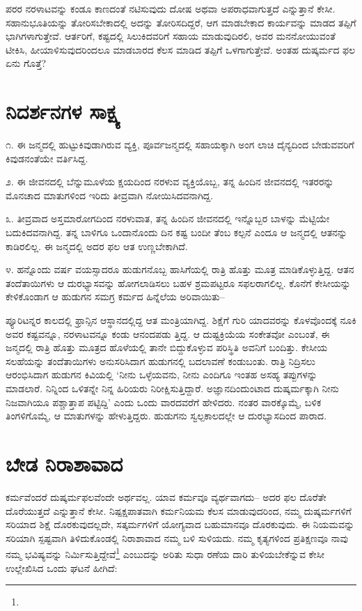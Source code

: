 ಪರರ ನರಳಾಟವನ್ನು ಕಂಡೂ ಕಾಣದಂತೆ ನಟಿಸುವುದು ದೋಷ ಅಥವಾ ಅಪರಾಧವಾಗುತ್ತದೆ ಎನ್ನುತ್ತಾನೆ ಕೇಸೀ. ಸಹಾನುಭೂತಿಯನ್ನು ತೋರಿಸಬೇಕಾದಲ್ಲಿ ಅದನ್ನು ತೋರಿಸದಿದ್ದರೆ, ಆಗ ಮಾಡಬೇಕಾದ ಕಾರ್ಯವನ್ನು ಮಾಡದ ತಪ್ಪಿಗೆ  ಭಾಗಿಗಳಾಗುತ್ತೇವೆ. ಆರ್ತರಿಗೆ, ಕಷ್ಟದಲ್ಲಿ ಸಿಲುಕಿದವರಿಗೆ ಸಹಾಯ ಮಾಡುವುದಿರಲಿ, ಅವರ ಮನನೋಯುವಂತೆ ಟೀಕಿಸಿ, ಹೀಯಾಳಿಸುವುದರಿಂದಲೂ ಮಾಡಬಾರದ ಕೆಲಸ ಮಾಡಿದ ತಪ್ಪಿಗೆ  ಒಳಗಾಗುತ್ತೇವೆ. ಅಂತಹ ದುಷ್ಕರ್ಮದ ಫಲ ಏನು ಗೊತ್ತೆ?


\section{ನಿದರ್ಶನಗಳ ಸಾಕ್ಷ್ಯ}

೧. ಈ ಜನ್ಮದಲ್ಲಿ ಹುಟ್ಟುಕಿವುಡಾಗಿರುವ ವ್ಯಕ್ತಿ, ಪೂರ್ವಜನ್ಮದಲ್ಲಿ ಸಹಾಯಕ್ಕಾಗಿ ಅಂಗ ಲಾಚಿ ದೈನ್ಯದಿಂದ ಬೇಡುವವರಿಗೆ ಕಿವುಡನಂತೆಯೇ ವರ್ತಿಸಿದ್ದ.

೨. ಈ ಜೀವನದಲ್ಲಿ ಬೆನ್ನುಮೂಳೆಯ ಕ್ಷಯದಿಂದ ನರಳುವ ವ್ಯಕ್ತಿಯೊಬ್ಬ, ತನ್ನ ಹಿಂದಿನ ಜೀವನದಲ್ಲಿ ಇತರರನ್ನು ಮೊನಚಾದ ಮಾತುಗಳಿಂದ ಇರಿದು ತೀವ್ರವಾಗಿ ನೋಯಿಸಿದವನಾಗಿದ್ದ.

೩. ತೀವ್ರವಾದ ಅಸ್ತಮಾರೋಗದಿಂದ ನರಳುವಾತ, ತನ್ನ ಹಿಂದಿನ ಜೀವನದಲ್ಲಿ ಇನ್ನೊಬ್ಬರ ಬಾಳನ್ನು ಮೆಟ್ಟಿಯೇ ಬದುಕಿದವನಾಗಿದ್ದ. ತನ್ನ ಬಾಳಿಗೂ ಒಂದಾನೊಂದು ದಿನ ಕಷ್ಟ ಬಂದೀ ತೆಂಬ ಕಲ್ಪನೆ ಎಂದೂ ಆ ಜನ್ಮದಲ್ಲಿ ಆತನನ್ನು ಕಾಡಿರಲಿಲ್ಲ. ಈ ಜನ್ಮದಲ್ಲಿ ಅದರ ಫಲ ಆತ ಉಣ್ಣಬೇಕಾಗಿದೆ.

೪. ಹನ್ನೊಂದು ವರ್ಷ ವಯಸ್ಸಾದರೂ ಹುಡುಗನೊಬ್ಬ ಹಾಸಿಗೆಯಲ್ಲಿ ರಾತ್ರಿ ಹೊತ್ತು ಮೂತ್ರ ಮಾಡಿಕೊಳ್ಳುತ್ತಿದ್ದ. ಆತನ ತಂದೆತಾಯಿಗಳು ಆ ದುರಭ್ಯಾಸವನ್ನು ಹೋಗಲಾಡಿಸಲು ಬಹಳ ಶ್ರಮಪಟ್ಟರೂ ಸಫಲರಾಗಲಿಲ್ಲ. ಕೊನೆಗೆ ಕೇಸೀಯನ್ನು ಕೇಳಿಕೊಂಡಾಗ ಆ ಹುಡುಗನ ಸಮಗ್ರ ಕರ್ಮದ ಹಿನ್ನೆಲೆಯ ಅರಿವಾಯಿತು–

ಪ್ಯೂರಿಟನ್ನರ ಕಾಲದಲ್ಲಿ ಫ್ರಾನ್ಸಿನ ಆಸ್ಥಾನದಲ್ಲಿದ್ದ ಆತ ಮಂತ್ರಿಯಾಗಿದ್ದ. ಶಿಕ್ಷೆಗೆ ಗುರಿ ಯಾದವರನ್ನು ಕೊಳವೊಂದಕ್ಕೆ ನೂಕಿ ಅವರ ಕಷ್ಟವನ್ನೂ, ನರಳಾಟವನ್ನೂ ಕಂಡು ಆನಂದಪಡು ತ್ತಿದ್ದ. ಆ ದುಷ್ಟಕ್ರಿಯೆಯ ಸಂಕೇತವೋ ಎಂಬಂತೆ, ಈ ಜನ್ಮದಲ್ಲಿ ರಾತ್ರಿ ಹೊತ್ತು ಮೂತ್ರದ ಹೊಳೆಯಲ್ಲಿ ತಾನೇ ಬಿದ್ದುಕೊಳ್ಳುವ ಪರಿಸ್ಥಿತಿ ಅವನಿಗೆ ಬಂದಿತ್ತು. ಕೇಸೀಯ ಸಲಹೆಯನ್ನು ತಂದೆತಾಯಿಗಳು ಅನುಸರಿಸಿದಾಗ ಹುಡುಗನಲ್ಲಿ ಬದಲಾವಣೆ ಕಂಡುಬಂತು. ರಾತ್ರಿ ನಿದ್ರಿಸಲು ಆರಂಭಿಸಿದಾಗ ಹುಡುಗನ ಕಿವಿಯಲ್ಲಿ ‘ನೀನು ಒಳ್ಳೆಯವನು, ನೀನು ಎಂದಿಗೂ ಇಂತಹ ಅಸಹ್ಯ ತಪ್ಪುಗಳನ್ನು ಮಾಡಲಾರೆ. ನಿನ್ನಿಂದ ಒಳಿತನ್ನೇ ನಿನ್ನ ಹಿರಿಯರು ನಿರೀಕ್ಷಿಸುತ್ತಿದ್ದಾರೆ. ಅಜ್ಞಾನದಿಂದುಂಟಾದ ದುಷ್ಕರ್ಮಕ್ಕಾಗಿ ನೀನು ನಿಜವಾಗಿಯೂ ಪಶ್ಚಾತ್ತಾಪ ಪಟ್ಟಿದ್ದಿ’ ಎಂದು ಒಂದು ವಾರದವರೆಗೆ ಹೇಳಿದರು. ನಂತರ ವಾರಕ್ಕೊಮ್ಮೆ, ಬಳಿಕ ತಿಂಗಳಿಗೊಮ್ಮೆ, ಆ ಮಾತುಗಳನ್ನು ಹೇಳುತ್ತಿದ್ದರು. ಹುಡುಗನು ಸ್ವಲ್ಪಕಾಲದಲ್ಲೇ ಆ ದುರಭ್ಯಾಸದಿಂದ ಪಾರಾದ.


\section{ಬೇಡ ನಿರಾಶಾವಾದ}

ಕರ್ಮವೆಂದರೆ ದುಷ್ಕರ್ಮಫಲವೆಂದೇ ಅರ್ಥವಲ್ಲ. ಯಾವ ಕರ್ಮವೂ ವ್ಯರ್ಥವಾಗದು– ಅದರ ಫಲ ದೊರೆತೇ ದೊರೆಯುತ್ತದೆ ಎನ್ನುತ್ತಾನೆ ಕೇಸೀ. ನಿಷ್ಪಕ್ಷಪಾತವಾಗಿ ಕರ್ಮನಿಯಮ ಕೆಲಸ ಮಾಡುವುದರಿಂದ, ನಮ್ಮ ದುಷ್ಕರ್ಮಗಳಿಗೆ ಸರಿಯಾದ ಶಿಕ್ಷೆ ದೊರಕುವುದಲ್ಲದೇ, ಸತ್ಕರ್ಮಗಳಿಗೆ ಯೋಗ್ಯವಾದ ಬಹುಮಾನವೂ ದೊರಕುವುದು. ಈ ನಿಯಮವನ್ನು ಸರಿಯಾಗಿ ಸ್ಪಷ್ಟವಾಗಿ ತಿಳಿದುಕೊಂಡಲ್ಲಿ ನಿರಾಶಾವಾದ ನಮ್ಮ ಬಳಿ ಸುಳಿಯದು. ನಮ್ಮ ಕೃತ್ಯಗಳಿಂದ ಪ್ರತಿಕ್ಷಣವೂ ನಾವು ನಮ್ಮ ಭವಿಷ್ಯವನ್ನು ನಿರ್ಮಿಸುತ್ತಿದ್ದೇವೆ\footnote{} ಎಂಬುದನ್ನು ಅರಿತು ಸುಧಾ ರಣೆಯ ದಾರಿ ತುಳಿಯಬೇಕೆನ್ನುವ ಕೇಸೀ ಉಲ್ಲೇಖಿಸಿದ ಒಂದು ಘಟನೆ ಹೀಗಿದೆ:

